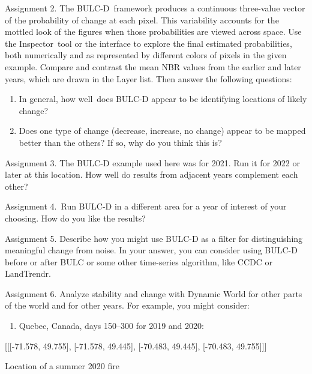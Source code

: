 \documentclass[
  letterpaper,
  DIV=11,
  numbers=noendperiod]{scrreprt}
\providecommand{\tightlist}{%
  \setlength{\itemsep}{0pt}\setlength{\parskip}{0pt}}\usepackage{longtable,booktabs,array}
\begin{document}
Assignment 2. The BULC-D~framework produces a continuous three-value
vector of the probability of change at each pixel. This variability
accounts for the mottled look of the figures when those probabilities
are viewed across space. Use the Inspector~tool or the interface to
explore the final estimated probabilities, both numerically and as
represented by different colors of pixels in the given example. Compare
and contrast the mean NBR values from the earlier and later years, which
are drawn in the Layer list. Then answer the following questions:

\begin{enumerate}
\def\labelenumi{\arabic{enumi}.}
\tightlist
\item
  In general, how well~does BULC-D appear to be identifying locations of
  likely change?
\item
  Does one type of change (decrease, increase, no change) appear to be
  mapped better than the others? If so, why do you think this is?
\end{enumerate}

Assignment 3. The BULC-D example used here was for 2021. Run it for 2022
or later at this location. How well do results from adjacent years
complement each other?

Assignment 4.~Run BULC-D in a different area for a year of interest of
your choosing. How do you like the results?

Assignment 5. Describe how you might use BULC-D as a filter for
distinguishing meaningful change from noise. In your answer, you can
consider using BULC-D before or after BULC or some other time-series
algorithm, like CCDC or LandTrendr.

Assignment 6. Analyze stability and change with Dynamic World for other
parts of the world and for other years. For example, you might consider:

\begin{enumerate}
\def\labelenumi{\arabic{enumi}.}
\tightlist
\item
  Quebec, Canada, days 150--300 for 2019 and 2020:
\end{enumerate}

{[}{[}{[}-71.578, 49.755{]}, {[}-71.578, 49.445{]}, {[}-70.483,
49.445{]}, {[}-70.483, 49.755{]}{]}{]}

Location of a summer 2020 fire
\end{document}
